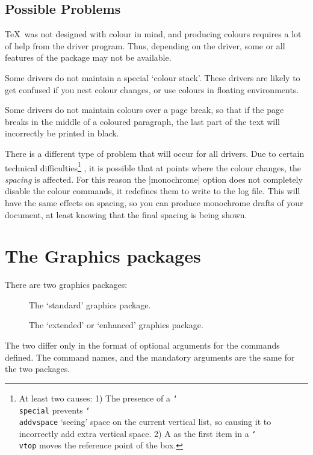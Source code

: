 \subsection{Possible Problems}

\TeX\ was not designed with colour in mind, and producing colours
requires a lot of help from the driver program. Thus, depending on the
driver, some or all features of the  package may not be
available.

Some drivers do not maintain a special `colour stack'. These drivers are
likely to get confused if you nest colour changes, or use colours in
floating environments.

Some drivers do not maintain colours over a page break, so that if the
page breaks in the middle of a coloured paragraph, the last part of the
text will incorrectly be printed in black.

There is a different type of problem that will occur for all drivers.
Due to certain technical difficulties\footnote{At least two causes:
1) The presence of a \texttt{\char`\\special}  prevents
\texttt{\char`\\addvspace} `seeing' space on the current vertical list,
so causing it to incorrectly add extra vertical space. 2) A
 as the first item in a \texttt{\char`\\vtop} moves the
reference point of the box.}%
, it is possible that at points
where the colour changes, the \emph{spacing} is affected. For this
reason the |monochrome| option does not completely disable the colour
commands, it redefines them to write to the log file. This will have the
same effects on spacing, so you can produce monochrome drafts of your
document, at least knowing that the final spacing is being shown.
\section{The Graphics packages}
There are two graphics packages:
\begin{description}
\item[] The `standard' graphics package.
\item[] The `extended' or `enhanced' graphics
  package.
\end{description}
The two differ only in the format of optional arguments for the
commands defined. The command names, and the mandatory arguments are
the same for the two packages.

